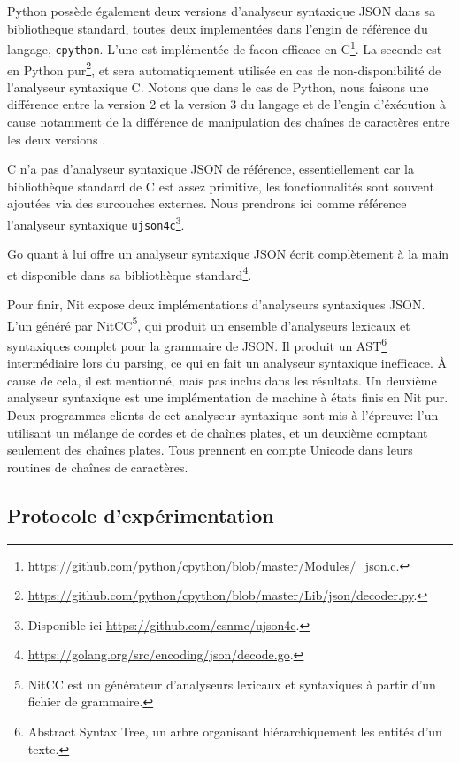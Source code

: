 Python possède également deux versions d'analyseur syntaxique JSON dans sa bibliotheque standard,
toutes deux implementées dans l'engin de référence du langage, \texttt{cpython}.
L'une est implémentée de facon efficace en C\footnote{\url{https://github.com/python/cpython/blob/master/Modules/_json.c}.}.
La seconde est en Python pur\footnote{\url{https://github.com/python/cpython/blob/master/Lib/json/decoder.py}.},
et sera automatiquement utilisée en cas de non-disponibilité de l'analyseur syntaxique C.
Notons que dans le cas de Python, nous faisons une différence entre la version 2 et la version
3 du langage et de l'engin d'éxécution à cause notamment de la différence de manipulation
des chaînes de caractères entre les deux versions \cite{PEP393}.

C n'a pas d'analyseur syntaxique JSON de référence, essentiellement car la bibliothèque standard
de C est assez primitive, les fonctionnalités sont souvent ajoutées via des surcouches externes.
Nous prendrons ici comme référence l'analyseur syntaxique \texttt{ujson4c}\footnote{Disponible ici \url{https://github.com/esnme/ujson4c}.}.

Go quant à lui offre un analyseur syntaxique JSON écrit complètement à la main et disponible
dans sa bibliothèque standard\footnote{\url{https://golang.org/src/encoding/json/decode.go}.}.

Pour finir, Nit expose deux implémentations d'analyseurs syntaxiques JSON.
L'un généré par NitCC\footnote{NitCC est un générateur d'analyseurs lexicaux et syntaxiques à partir d'un fichier de grammaire.},
qui produit un ensemble d'analyseurs lexicaux et syntaxiques complet pour la grammaire
de JSON. Il produit un AST\footnote{Abstract Syntax Tree, un arbre organisant hiérarchiquement les
entités d'un texte.} intermédiaire lors du parsing, ce qui en fait un analyseur syntaxique inefficace.
À cause de cela, il est mentionné, mais pas inclus dans les résultats.
Un deuxième analyseur syntaxique est une implémentation de machine à états finis en Nit pur.
Deux programmes clients de cet analyseur syntaxique sont mis à l'épreuve: l'un utilisant un mélange de cordes et
de chaînes plates, et un deuxième comptant seulement des chaînes plates.
Tous prennent en compte Unicode dans leurs routines de chaînes de caractères.

\subsection{Protocole d'expérimentation}

